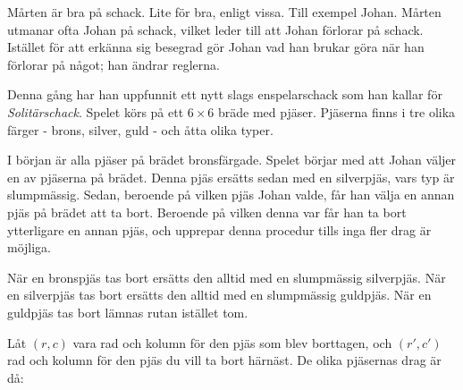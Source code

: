 Mårten är bra på schack. Lite för bra, enligt vissa. Till exempel Johan. Mårten utmanar ofta Johan på schack,
vilket leder till att Johan förlorar på schack. Istället för att erkänna sig besegrad gör Johan vad han
brukar göra när han förlorar på något; han ändrar reglerna.

Denna gång har han uppfunnit ett nytt slags enspelarschack som han kallar för \emph{Solitärschack}. Spelet
körs på ett $6 \times 6$ bräde med pjäser. Pjäserna finns i tre olika färger - brons, silver, guld - och
åtta olika typer.

I början är alla pjäser på brädet bronsfärgade. Spelet börjar med att Johan väljer en av pjäserna på brädet.
Denna pjäs ersätts sedan med en silverpjäs, vars typ är slumpmässig. Sedan, beroende på vilken pjäs Johan
valde, får han välja en annan pjäs på brädet att ta bort. Beroende på vilken denna var får han ta bort ytterligare
en annan pjäs, och upprepar denna procedur tills inga fler drag är möjliga.

När en bronspjäs tas bort ersätts den alltid med en slumpmässig silverpjäs. När en silverpjäs tas bort
ersätts den alltid med en slumpmässig guldpjäs. När en guldpjäs tas bort lämnas rutan istället tom.

Låt $(r, c)$ vara rad och kolumn för den pjäs som blev borttagen, och $(r', c')$ rad och kolumn för den
pjäs du vill ta bort härnäst. De olika pjäsernas drag är då:

